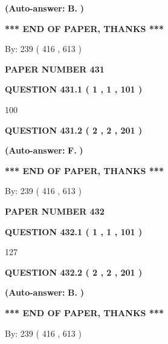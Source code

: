 \documentclass[12pt]{article}
\begin{document}
 
{\textbf{(Auto-answer:}}
{\textbf{\large{
B.}}}
{\textbf{)}}
 
 
   
   
   
   
\vspace{1.0in} 
{\textbf{\large{ *** END OF PAPER, THANKS *** }}} 
   
   
\hspace{1.0in} By: 
 239 ( 416 ,  613 )
   
   
   
   
\newpage 
\setcounter{page}{ 
   431001 } 
   
   
 {\textbf{ \Large{ PAPER NUMBER  431  }}}
   
   
   
   
  
  
{\textbf{\large{QUESTION
431.1 
 ( 1 , 1 , 101 )
}}}

100
  
  
{\textbf{\large{QUESTION
431.2 
 ( 2 , 2 , 201 )
}}}
 
 
{\textbf{(Auto-answer:}}
{\textbf{\large{
F.}}}
{\textbf{)}}
 
 
   
   
   
   
\vspace{1.0in} 
{\textbf{\large{ *** END OF PAPER, THANKS *** }}} 
   
   
\hspace{1.0in} By: 
 239 ( 416 ,  613 )
   
   
   
   
\newpage 
\setcounter{page}{ 
   432001 } 
   
   
 {\textbf{ \Large{ PAPER NUMBER  432  }}}
   
   
   
   
  
  
{\textbf{\large{QUESTION
432.1 
 ( 1 , 1 , 101 )
}}}

127
  
  
{\textbf{\large{QUESTION
432.2 
 ( 2 , 2 , 201 )
}}}
 
 
{\textbf{(Auto-answer:}}
{\textbf{\large{
B.}}}
{\textbf{)}}
 
 
   
   
   
   
\vspace{1.0in} 
{\textbf{\large{ *** END OF PAPER, THANKS *** }}} 
   
   
\hspace{1.0in} By: 
 239 ( 416 ,  613 )
   
   
   
\end{document}
